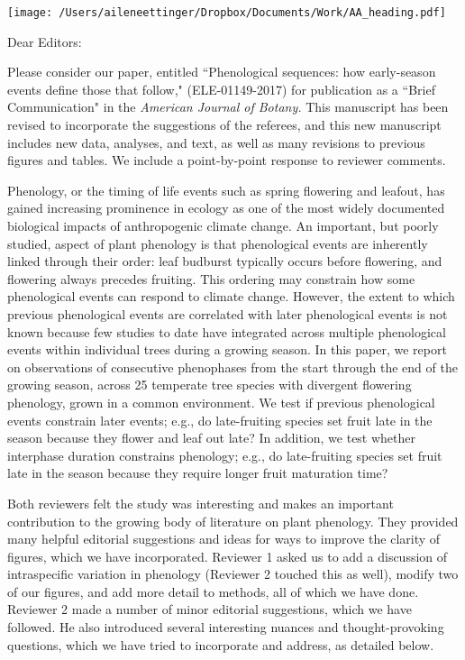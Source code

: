 \documentclass[10.95pt,a4paper]{letter}
\date{May 31, 2018}
\begin{document}
%

\begin{letter}{}
\texttt{[image: /Users/aileneettinger/Dropbox/Documents/Work/AA\_heading.pdf]}

\opening{Dear Editors:}
Please consider our paper, entitled ``Phenological sequences: how early-season events define those that follow,"  (ELE-01149-2017) for publication as a ``Brief Communication" in the \emph{American Journal of Botany.} This manuscript has been revised to incorporate the suggestions of the referees, and this new manuscript includes new data, analyses, and text, as well as many revisions to previous figures and tables. We include a point-by-point response to reviewer comments.

Phenology, or the timing of life events such as spring flowering and leafout, has gained increasing prominence in ecology as one of the most widely documented biological impacts of anthropogenic climate change.  An important, but poorly studied, aspect of plant phenology is that phenological events are inherently linked through their order: leaf budburst typically occurs before flowering, and flowering always precedes fruiting. This ordering may constrain how some phenological events can respond to climate change. However, the extent to which previous phenological events are correlated with later phenological events is not known because few studies to date have integrated across multiple phenological events within individual trees during a growing season. In this paper, we report on observations of consecutive phenophases from the start through the end of the growing season, across 25 temperate tree species with divergent flowering phenology, grown in a common environment. We test if previous phenological events constrain later events; e.g., do late-fruiting species set fruit late in the season because they flower and leaf out late? In addition, we test whether interphase duration constrains phenology; e.g., do late-fruiting species set fruit late in the season because they require longer fruit maturation time? 

Both reviewers felt the study was interesting and makes an important contribution to the growing body of literature on plant phenology.  They provided many helpful editorial suggestions and ideas for ways to improve the clarity of figures, which we have incorporated. Reviewer 1 asked us to add a discussion of intraspecific variation in phenology (Reviewer 2 touched this as well), modify two of our figures, and add more detail to methods, all of which we have done. Reviewer 2 made a number of minor editorial suggestions, which we have followed. He also introduced several interesting nuances and thought-provoking questions, which we have tried to incorporate and address, as detailed below. 


\end{letter}
\end{document}
